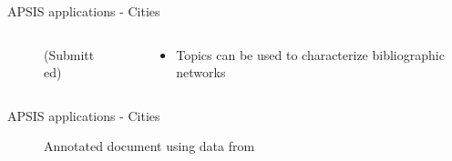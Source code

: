 \documentclass[9pt]{beamer}
\begin{document}
\begin{frame}{APSIS applications - Cities}

\nobibliography*

\begin{columns}
	\begin{column}{0.65\linewidth}
		\begin{figure}
			\caption{ (Submitted)}
		\end{figure}
		
	\end{column}
	
	\begin{column}{0.35\linewidth}	
		\begin{itemize}
			\item<1->Topics can be used to characterize bibliographic networks
		\end{itemize}
		
	\end{column}
\end{columns}

\end{frame}

\begin{frame}{APSIS applications - Cities}


		\begin{figure}
			\caption{Annotated document using data from \citet{Lamb2017} }
		\end{figure}


\end{frame}
\end{document}
